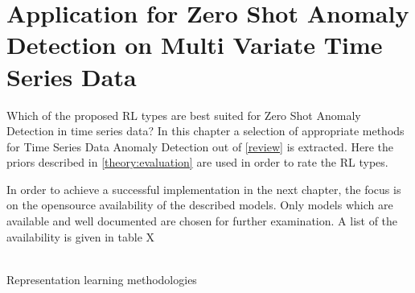 \section{Application for Zero Shot Anomaly Detection on Multi Variate Time Series Data}\label{application}
 Which of the proposed RL types are best suited for Zero Shot Anomaly Detection in time series data? In this chapter a selection of appropriate methods for Time Series Data Anomaly Detection out of \ref{review} is extracted. Here the priors described in \ref{theory:evaluation} are used in order to rate the RL types.

 In order to achieve a successful implementation in the next chapter, the focus is on the opensource availability of the described models. Only models which are available and well documented are chosen for further examination. A list of the availability is given in table X\\\\
 \begin{table}
   \caption{Representation learning methodologies}\label{tab_rl_methods}
   
 \end{table}
\cite{fung_model_2024} \\\\ %
